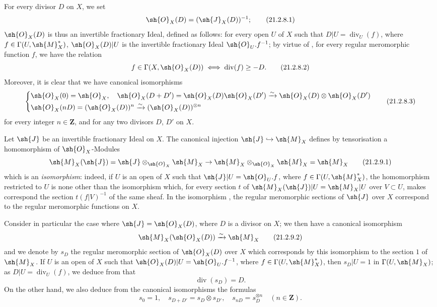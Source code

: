 \begin{env}[21.2.8]
\label{IV.21.2.8}
For every divisor $D$ on $X$, we set
\[
\label{IV.21.2.8.1}
  \sh{O}_X(D)=(\sh{J}_X(D))^{-1};
  \tag{21.2.8.1}
\]
$\sh{O}_X(D)$ is thus an invertible fractionary Ideal, defined as follows:
for every open $U$ of $X$ such that $D|U=\operatorname{div}_U(f)$, where $f\in\Gamma(U,\sh{M}_X^*)$, $\sh{O}_X(D)|U$ is the invertible fractionary Ideal
$\sh{O}_U.f^{-1}$;
by virtue of , for every regular meromorphic function $f$, we have the relation
\[
\label{IV.21.2.8.2}
  f\in\Gamma(X,\sh{O}_X(D)) \iff \operatorname{div}(f)\geq -D.
  \tag{21.2.8.2}
\]
Moreover, it is clear that we have canonical isomorphisms 
\[
\label{IV.21.2.8.3}
  \left\{\begin{aligned}
    &\sh{O}_X(0)=\sh{O}_X,\quad \sh{O}_X(D+D')=\sh{O}_X(D)\sh{O}_X(D')\xrightarrow{\sim}\sh{O}_X(D)\otimes\sh{O}_X(D')\\
    &\sh{O}_X(nD)=(\sh{O}_X(D))^n\xrightarrow{\sim}(\sh{O}_X(D))^{\otimes n}
  \end{aligned}\right.
  \tag{21.2.8.3}
\]
for every integer $n\in\mathbf{Z}$, and for any two divisors $D$, $D'$ on $X$.
\end{env}

\begin{env}[21.2.9]
\label{IV.21.2.9}
Let $\sh{J}$ be an invertible fractionary Ideal on $X$.
The canonical injection $\sh{J}\hookrightarrow\sh{M}_X$ defines by tensorisation a homomorphism of $\sh{O}_X$-Modules
\[
\label{IV.21.2.9.1}
  \sh{M}_X(\sh{J})=\sh{J}\otimes_{\sh{O}_X}\sh{M}_X\to\sh{M}_X\otimes_{\sh{O}_X}\sh{M}_X=\sh{M}_X
  \tag{21.2.9.1}
\]
which is an \emph{isomorphism}:
indeed, if $U$ is an open of $X$ such that $\sh{J}|U=\sh{O}_U.f$, where $f\in\Gamma(U,\sh{M}_X^*)$, the homomorphism  restricted to $U$ is none other than the isomorphism which, for every section $t$ of $\sh{M}_X(\sh{J})|U=\sh{M}_X|U$ over $V\subset U$, makes correspond the section $t(f|V)^{-1}$ of the same sheaf.
In the isomorphism , the regular meromorphic sections of $\sh{J}$ over $X$ correspond to the regular meromorphic functions on $X$.

Consider in particular the case where $\sh{J}=\sh{O}_X(D)$, where $D$ is a divisor on $X$;
we then have a canonical isomorphism
\[
\label{IV.21.2.9.2}
  \sh{M}_X(\sh{O}_X(D))\xrightarrow{\sim}\sh{M}_X
  \tag{21.2.9.2}
\]
and we denote by $s_D$ the regular meromorphic section of $\sh{O}_X(D)$ over $X$ which corresponds by this isomorphism to the section $1$ of $\sh{M}_X$.
If $U$ is an open of $X$ such that $\sh{O}_X(D)|U=\sh{O}_U.f^{-1}$, where $f\in\Gamma(U,\sh{M}_X^*)$, then $s_D|U=1$ in $\Gamma(U,\sh{M}_X)$;
as $D|U=\operatorname{div}_U(f)$, we deduce from  that
\[
\label{IV.21.2.9.3}
  \operatorname{div}(s_D)=D.
  \tag{21.2.9.3}
\]
On the other hand, we also deduce from the canonical isomorphisms  the formulas
\[
\label{IV.21.2.9.4}
  s_0=1,\quad s_{D+D'}=s_D\otimes s_{D'},\quad s_{nD}=s_D^{\otimes n}\quad (n\in\mathbf{Z}).
  \tag{21.2.9.4}
\]
\end{env}

